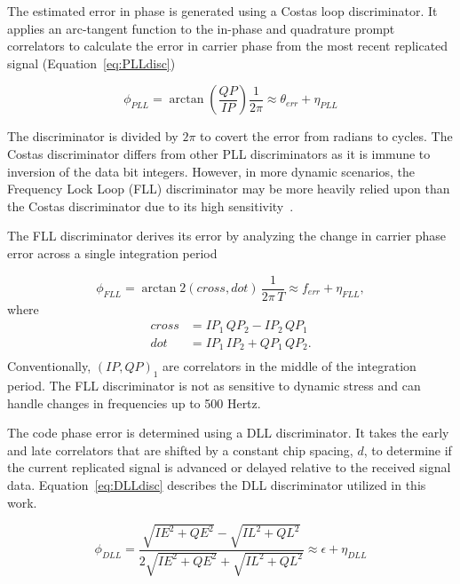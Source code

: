 The estimated error in phase is generated using a Costas loop discriminator. It applies an arc-tangent function to the in-phase and quadrature prompt correlators to calculate the error in carrier phase from the most recent replicated signal (Equation~\ref{eq:PLLdisc})

\begin{equation}\label{eq:PLLdisc}
    \phi_{PLL} = \arctan\left(\frac{QP}{IP}\right) \frac{1}{2\pi} \approx \theta_{err} + \eta_{PLL}
\end{equation}

The discriminator is divided by \(2 \pi \) to covert the error from radians to cycles. The Costas discriminator differs from other PLL discriminators as it is immune to inversion of the data bit integers. However, in more dynamic scenarios, the Frequency Lock Loop (FLL) discriminator may be more heavily relied upon than the Costas discriminator due to its high sensitivity~\cite{kaplanUnderstandingGPSPrinciples2006}.

The FLL discriminator derives its error by analyzing the change in carrier phase error across a single integration period

\begin{equation}\label{eq:FLLdisc}
    \phi_{FLL} = \arctan2\left(cross,dot\right) \, \frac{1}{2\pi \,T} \approx f_{err} + \eta_{FLL},
\end{equation}
where
\begin{equation}\label{eq:crossdot}
    \begin{split}
        cross & = IP_1\,QP_2 - IP_2\,QP_1\\
        dot & = IP_1\,IP_2 + QP_1\,QP_2. \\
    \end{split}
\end{equation}
Conventionally, \({\left(IP,QP\right)}_1\) are correlators in the middle of the integration period. The FLL discriminator is not as sensitive to dynamic stress and can handle changes in frequencies up to 500 Hertz.

The code phase error is determined using a DLL discriminator. It takes the early and late correlators that are shifted by a constant chip spacing, \(d\), to determine if the current replicated signal is advanced or delayed relative to the received signal data. Equation~\ref{eq:DLLdisc} describes the DLL discriminator utilized in this work.

\begin{equation}\label{eq:DLLdisc}
    \phi_{DLL} = \frac{\sqrt{IE^2 + QE^2} - \sqrt{IL^2 + QL^2}}{2 \sqrt{IE^2 + QE^2} + \sqrt{IL^2 + QL^2}} \approx \epsilon + \eta_{DLL}
\end{equation}

